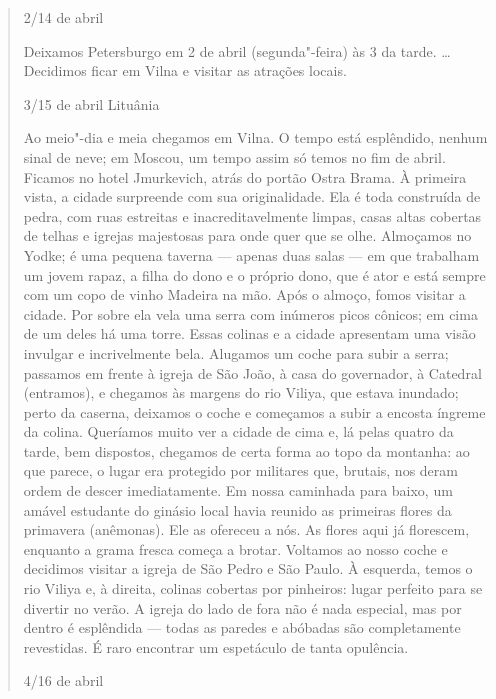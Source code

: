 \begin{quote}
2/14 de abril

Deixamos Petersburgo em 2 de abril (segunda"-feira) às 3 da tarde.
\ldots{} Decidimos ficar em Vilna e visitar as atrações locais.

3/15 de abril Lituânia

Ao meio"-dia e meia chegamos em Vilna. O tempo está esplêndido, nenhum
sinal de neve; em Moscou, um tempo assim só temos no fim de abril.
Ficamos no hotel Jmurkevich, atrás do portão Ostra Brama. À primeira
vista, a cidade surpreende com sua originalidade. Ela é toda construída
de pedra, com ruas estreitas e inacreditavelmente limpas, casas altas
cobertas de telhas e igrejas majestosas para onde quer que se olhe.
Almoçamos no Yodke; é uma pequena taverna --- apenas duas salas --- em que
trabalham um jovem rapaz, a filha do dono e o próprio dono, que é ator e
está sempre com um copo de vinho Madeira na mão. Após o almoço, fomos
visitar a cidade. Por sobre ela vela uma serra com inúmeros picos
cônicos; em cima de um deles há uma torre. Essas colinas e a cidade
apresentam uma visão invulgar e incrivelmente bela. Alugamos um coche
para subir a serra; passamos em frente à igreja de São João, à casa do
governador, à Catedral (entramos), e chegamos às margens do rio Viliya,
que estava inundado; perto da caserna, deixamos o coche e começamos a
subir a encosta íngreme da colina. Queríamos muito ver a cidade de cima
e, lá pelas quatro da tarde, bem dispostos, chegamos de certa forma ao
topo da montanha: ao que parece, o lugar era protegido por militares
que, brutais, nos deram ordem de descer imediatamente. Em nossa
caminhada para baixo, um amável estudante do ginásio local havia reunido
as primeiras flores da primavera (anêmonas). Ele as ofereceu a nós. As
flores aqui já florescem, enquanto a grama fresca começa a brotar.
Voltamos ao nosso coche e decidimos visitar a igreja de São Pedro e São
Paulo. À esquerda, temos o rio Viliya e, à direita, colinas cobertas por
pinheiros: lugar perfeito para se divertir no verão. A igreja do lado de
fora não é nada especial, mas por dentro é esplêndida --- todas as paredes
e abóbadas são completamente revestidas. É raro encontrar um espetáculo
de tanta opulência.

4/16 de abril


\end{quote}
